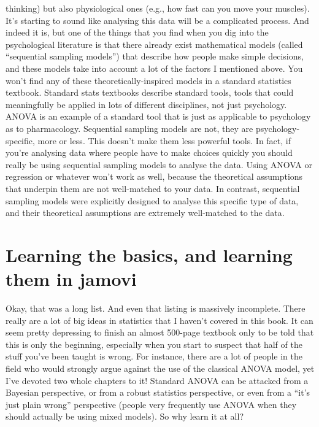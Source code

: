 \documentclass[
  a4paper,
]{book}
\begin{document}
\begin{itemize}
  thinking) but also physiological ones (e.g., how fast can you move
  your muscles). It's starting to sound like analysing this data will be
  a complicated process. And indeed it is, but one of the things that
  you find when you dig into the psychological literature is that there
  already exist mathematical models (called ``sequential sampling
  models'') that describe how people make simple decisions, and these
  models take into account a lot of the factors I mentioned above. You
  won't find any of these theoretically-inspired models in a standard
  statistics textbook. Standard stats textbooks describe standard tools,
  tools that could meaningfully be applied in lots of different
  disciplines, not just psychology. ANOVA is an example of a standard
  tool that is just as applicable to psychology as to pharmacology.
  Sequential sampling models are not, they are psychology-specific, more
  or less. This doesn't make them less powerful tools. In fact, if
  you're analysing data where people have to make choices quickly you
  should really be using sequential sampling models to analyse the data.
  Using ANOVA or regression or whatever won't work as well, because the
  theoretical assumptions that underpin them are not well-matched to
  your data. In contrast, sequential sampling models were explicitly
  designed to analyse this specific type of data, and their theoretical
  assumptions are extremely well-matched to the data.
\end{itemize}

\hypertarget{learning-the-basics-and-learning-them-in-jamovi}{%
\section*{Learning the basics, and learning them in
jamovi}\label{learning-the-basics-and-learning-them-in-jamovi}}


Okay, that was a long list. And even that listing is massively
incomplete. There really are a lot of big ideas in statistics that I
haven't covered in this book. It can seem pretty depressing to finish an
almost 500-page textbook only to be told that this is only the
beginning, especially when you start to suspect that half of the stuff
you've been taught is wrong. For instance, there are a lot of people in
the field who would strongly argue against the use of the classical
ANOVA model, yet I've devoted two whole chapters to it! Standard ANOVA
can be attacked from a Bayesian perspective, or from a robust statistics
perspective, or even from a ``it's just plain wrong'' perspective
(people very frequently use ANOVA when they should actually be using
mixed models). So why learn it at all?
\end{document}
